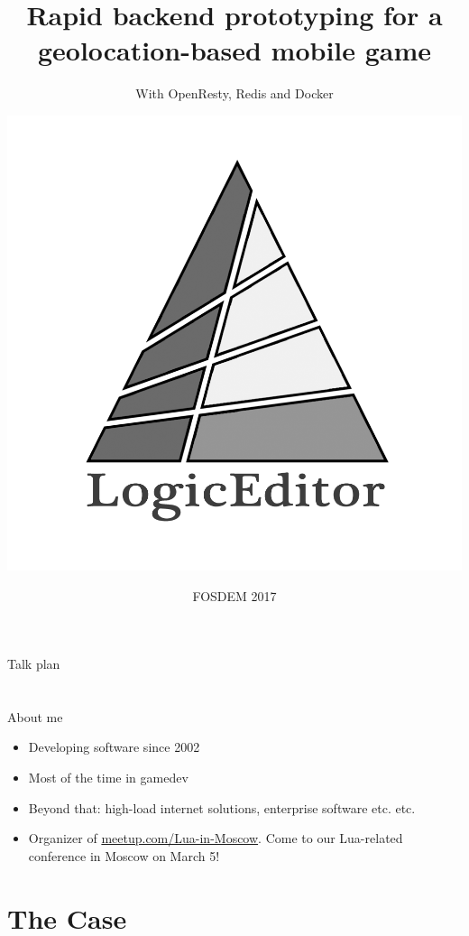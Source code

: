\documentclass[aspectratio=169,handout,bigger]{beamer}
\title{Rapid backend prototyping for a geolocation-based mobile game}
\subtitle{With OpenResty, Redis and Docker}
\author{\includegraphics[height=.4\textheight]{logo}}
\institute{Alexander Gladysh <ag@logiceditor.com>\newline@agladysh}
\date{FOSDEM 2017}
\begin{document}
\begin{frame}[plain]
 \titlepage
\end{frame}


\begin{frame}{Talk plan}

\tableofcontents

\end{frame}


\section*{}

\begin{frame}{About me}

\begin{itemize}
\item Developing software since 2002
\item Most of the time in gamedev
\item Beyond that: high-load internet solutions, enterprise software etc. etc.
\item Organizer of
      \href{http://meetup.com/Lua-in-Moscow}{meetup.com/Lua-in-Moscow}.
      Come to our Lua-related conference in Moscow on March 5!
\end{itemize}

\end{frame}


\section{The Case}

\end{document}
